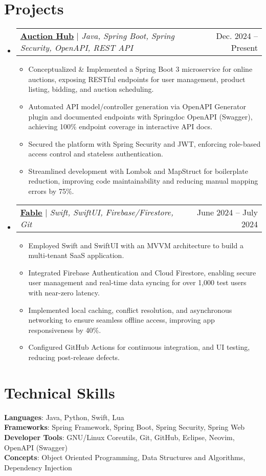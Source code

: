 \documentclass[a4paper,12pt]{article}
\makeatletter
\newcommand{\resumeItem}[1]{
  \item\small{
    {#1 \vspace{-2pt}}
  }
}
\newcommand{\resumeProjectHeading}[2]{
    \item
    \begin{tabular*}{0.97\textwidth}{l@{\extracolsep{\fill}}r}
      \small#1 & #2 \\
    \end{tabular*}\vspace{-7pt}
}
\newcommand{\resumeSubHeadingListStart}{\begin{itemize}[leftmargin=0.15in, label={}]}
\newcommand{\resumeSubHeadingListEnd}{\end{itemize}}
\newcommand{\resumeItemListStart}{\begin{itemize}}
\newcommand{\resumeItemListEnd}{\end{itemize}\vspace{-5pt}}
\makeatother
\begin{document}
\section{Projects}
    \resumeSubHeadingListStart
      \resumeProjectHeading
      {\textbf{\underline{\href{https://github.com/VanshajSaxena/auction-system}{Auction Hub}}} $|$ \emph{Java, Spring Boot, Spring Security, OpenAPI, REST API}}{Dec. 2024 -- Present}
          \resumeItemListStart
            \resumeItem{Conceptualized \& Implemented a Spring Boot 3 microservice for online auctions, exposing RESTful endpoints for user management, product listing, bidding, and auction scheduling.}
            \resumeItem{Automated API model/controller generation via OpenAPI Generator plugin and documented endpoints with Springdoc OpenAPI (Swagger), achieving 100\% endpoint coverage in interactive API docs. }
            \resumeItem{Secured the platform with Spring Security and JWT, enforcing role-based access control and stateless authentication.}
            \resumeItem{Streamlined development with Lombok and MapStruct for boilerplate reduction, improving code maintainability and reducing manual mapping errors by 75\%.}
          \resumeItemListEnd
      \resumeProjectHeading
      {\textbf{\underline{\href{https://github.com/VanshajSaxena/LMS_User}{Fable}}} $|$ \emph{Swift, SwiftUI, Firebase/Firestore, Git}}{June 2024 -- July 2024}
          \resumeItemListStart
            \resumeItem{Employed Swift and SwiftUI with an MVVM architecture to build a multi-tenant SaaS application.}
            \resumeItem{Integrated Firebase Authentication and Cloud Firestore, enabling secure user management and real-time data syncing for over 1,000 test users with near-zero latency.}
            \resumeItem{Implemented local caching, conflict resolution, and asynchronous networking to ensure seamless offline access, improving app responsiveness by 40\%.}
            \resumeItem{Configured GitHub Actions for continuous integration, and UI testing, reducing post-release defects.}
          \resumeItemListEnd
    \resumeSubHeadingListEnd



%
\section{Technical Skills}
 \begin{itemize}[leftmargin=0.15in, label={}]
    \small{\item{
     \textbf{Languages}{: Java, Python, Swift, Lua} \\
     \textbf{Frameworks}{: Spring Framework, Spring Boot, Spring Security, Spring Web} \\
     \textbf{Developer Tools}{: GNU/Linux Coreutils, Git, GitHub, Eclipse, Neovim, OpenAPI (Swagger)} \\
     \textbf{Concepts}{: Object Oriented Programming, Data Structures and Algorithms, Dependency Injection}
    }}
 \end{itemize}


\end{document}
